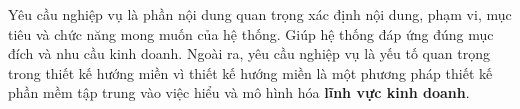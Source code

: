 Yêu cầu nghiệp vụ là phần nội dung quan trọng xác định nội dung, phạm vi, mục tiêu và chức năng mong muốn của hệ thống. Giúp hệ thống đáp ứng đúng mục đích và nhu cầu kinh doanh. Ngoài ra, yêu cầu nghiệp vụ là yếu tố quan trọng trong thiết kế hướng miền vì thiết kế hướng miền là một phương pháp thiết kế phần mềm tập trung vào việc hiểu và mô hình hóa \textbf{lĩnh vực kinh doanh}.